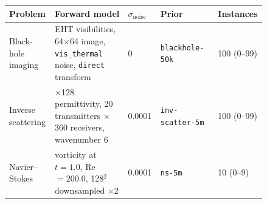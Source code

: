 \small
\setlength{\tabcolsep}{4pt}
\sloppy
\begin{tabular}{@{}p{0.17\linewidth}p{0.28\linewidth}p{0.06\linewidth}p{0.22\linewidth}p{0.11\linewidth}@{}}
\toprule
Problem & Forward model & $\sigma_{\text{noise}}$ & Prior & Instances \\
\midrule
\raggedright\sloppy Black-hole imaging & \raggedright\sloppy EHT visibilities, 64$\times$64 image, \texttt{vis\_thermal} noise, \texttt{direct} transform & 0 & \raggedright\sloppy \texttt{\scriptsize blackhole-50k} & 100 (0--99) \\
\raggedright\sloppy Inverse scattering & \raggedright\sloppy 128$\times$128 permittivity, 20 transmitters $\times$ 360 receivers, wavenumber 6 & 0.0001 & \raggedright\sloppy \texttt{\scriptsize inv-scatter-5m} & 100 (0--99) \\
\raggedright\sloppy Navier--Stokes & \raggedright\sloppy vorticity at $t=1.0$, Re${}=200.0$, 128$^2$ downsampled $\times$2 & 0.0001 & \raggedright\sloppy \texttt{\scriptsize ns-5m} & 10 (0--9) \\
\bottomrule
\end{tabular}
